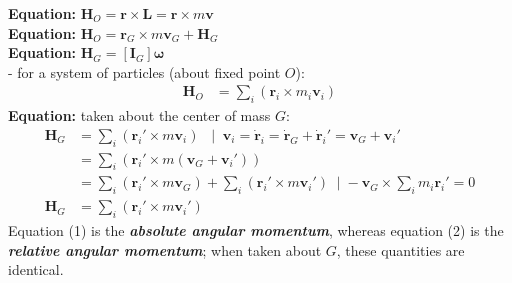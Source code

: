 \documentclass[10pt,landscape]{article}
\begin{document}
\begin{multicols}{3}
    {\bf Equation:} $\mathbf{H}_{O} = \mathbf{r} \times \mathbf{L} = \mathbf{r} 
    \times m\mathbf{v}$ \\
    {\bf Equation:} $\mathbf{H}_{O} = \mathbf{r}_G \times m\mathbf{v}_G + \mathbf{H}_G$ \\
    {\bf Equation:} $\mathbf{H}_{G} = [\mathbf{I}_G]\boldsymbol{\omega} $ \\
    - for a system of particles (about fixed point $O$):
    \begin{align*}
        \mathbf{H}_O &= \sum_i \left( \mathbf{r}_i \times m_i \mathbf{v}_i \right)
    \end{align*}
    {\bf Equation:} taken about the center of mass $G$:
    \begin{align}
        \mathbf{H}_G &= \sum_i \left( \mathbf{r}_i' \times m \mathbf{v}_i \right) \;\;\; | \;\; \mathbf{v}_i = 
            \mathbf{\dot{r}}_i = \mathbf{\dot{r}}_G + \mathbf{\dot{r}}_i' = \mathbf{v}_G + \mathbf{v}_i' \\
        &= \sum_i \left( \mathbf{r}_i' \times m \left( \mathbf{v}_G + \mathbf{v}_i' \right) \right) \nonumber\\
        &= \sum_i \left( \mathbf{r}_i' \times m \mathbf{v}_G \right) + 
           \sum_i \left( \mathbf{r}_i' \times m \mathbf{v}_i' \right)\;\; | 
           \; -\mathbf{v}_G \times \sum_i m_i \mathbf{r}_i' = 0  \nonumber\\
        \mathbf{H}_G &= \sum_i \left( \mathbf{r}_i' \times m \mathbf{v}_i' \right)
    \end{align}
    Equation (1) is the {\bf \em absolute angular momentum}, whereas
    equation (2) is the {\bf \em relative angular momentum}; when taken about 
    $G$, these quantities are identical.


\end{multicols}
\end{document}
